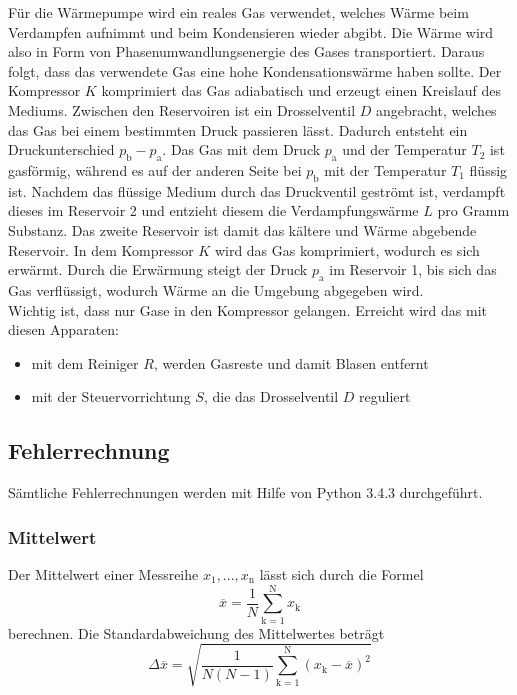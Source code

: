 Für die Wärmepumpe wird ein reales Gas verwendet, welches Wärme beim Verdampfen aufnimmt und beim Kondensieren wieder abgibt. Die Wärme wird also in Form von Phasenumwandlungsenergie des Gases transportiert. Daraus folgt, dass das verwendete Gas eine hohe Kondensationswärme haben sollte. Der Kompressor $K$ komprimiert das Gas adiabatisch und erzeugt einen Kreislauf des Mediums. Zwischen den Reservoiren ist ein Drosselventil $D$ angebracht, welches das Gas bei einem bestimmten Druck passieren lässt. Dadurch entsteht ein Druckunterschied $p_\text{b} - p_\text{a}$. Das Gas mit dem Druck $p_\text{a}$ und der Temperatur $T_\text{2}$ ist gasförmig, während es auf der anderen Seite bei $p_\text{b}$ mit der Temperatur $T_\text{1}$ flüssig ist. Nachdem das flüssige Medium durch das Druckventil geströmt ist, verdampft dieses im Reservoir 2 und entzieht diesem die Verdampfungswärme $L$ pro Gramm Substanz. Das zweite Reservoir ist damit das kältere und Wärme abgebende Reservoir. In dem Kompressor $K$ wird das Gas komprimiert, wodurch es sich erwärmt. Durch die Erwärmung steigt der Druck $p_\text{a}$ im Reservoir 1, bis sich das Gas verflüssigt, wodurch Wärme an die Umgebung abgegeben wird. \\
Wichtig ist, dass nur Gase in den Kompressor gelangen. Erreicht wird das mit diesen Apparaten:
\begin{itemize}
\item mit dem Reiniger $R$, werden Gasreste und damit Blasen entfernt
\item mit der Steuervorrichtung $S$, die das Drosselventil $D$ reguliert
\end{itemize}

\newpage
\subsection{Fehlerrechnung}
Sämtliche Fehlerrechnungen werden mit Hilfe von Python 3.4.3 durchgeführt.
\subsubsection{Mittelwert}
Der Mittelwert einer Messreihe $x_\text{1}, ... ,x_\text{n}$ lässt sich durch die Formel
\begin{equation}
	\overline{x} = \frac{1}{N} \sum_{\text{k}=1}^\text{N} x_\text{k}
	\label{eqn:ave}
\end{equation}
berechnen. Die Standardabweichung des Mittelwertes beträgt
\begin{equation}
	\Delta \overline{x} = \sqrt{ \frac{1}{N(N-1)} \sum_{\text{k}=1}^\text{N} (x_\text{k} - \overline{x})^2}
	\label{eqn:var}
\end{equation}

